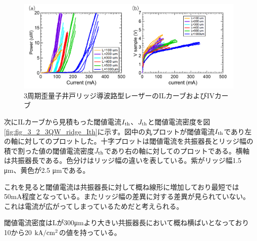 {\begin{figure}[h]
	\centering
	\includegraphics[width=15cm]{figure/fig_3_2_3QW_ridge_IL.png}
		\caption{3周期歪量子井戸リッジ導波路型レーザーのILカーブおよびIVカーブ}
		\label{fig:fig_3_2_3QW_ridge_IL}
\end{figure}


次にILカーブから見積もった閾値電流$I_{\rm{th}}$、$J_{\rm{th}}$と閾値電流密度を図\ref{fig:fig_3_2_3QW_ridge_Ith}に示す。図中の丸プロットが閾値電流$I_{\rm{th}}$であり左の軸に対してのプロットした。十字プロットは閾値電流を共振器長とリッジ幅の積で割った値の閾値電流密度$J_{\rm{th}}$であり右の軸に対してのプロットである。横軸は共振器長である。色分けはリッジ幅の違いを表している。紫がリッジ幅1.5 \si{\micro\metre}、黄色が2.5 \si{\micro\metre}である。

これを見ると閾値電流は共振器長に対して概ね線形に増加しており最短では50mA程度となっている。またリッジ幅の差異に対する差異が見られていない。これは電流が広がってしまっているためだと考えられる。

閾値電流密度はLが300\si{\micro\metre}より大きい共振器長において概ね横ばいとなっており10から20 $\rm{kA/cm^2}$の値を持っている。


}
